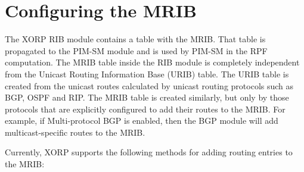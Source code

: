\section{Configuring the MRIB}

The XORP RIB module contains a table with the MRIB. That table is
propagated to the PIM-SM module and is used by PIM-SM in the RPF
computation. The MRIB table inside the RIB module is completely
independent from the Unicast Routing Information Base (URIB) table.
The URIB table is created from the unicast routes calculated by unicast
routing protocols such as BGP, OSPF and RIP.
The MRIB table is created similarly, but only by those protocols that
are explicitly configured to add their routes to the MRIB. For example,
if Multi-protocol BGP is enabled, then the BGP module will add
multicast-specific routes to the MRIB.

Currently, XORP supports the following methods for adding routing
entries to the MRIB:


